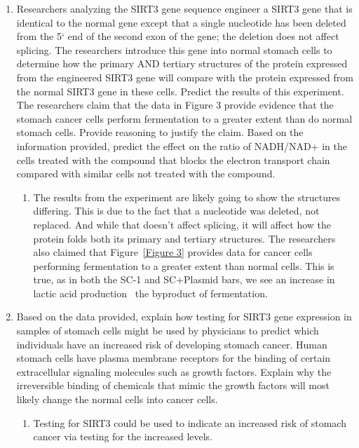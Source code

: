\documentclass[11pt]{article}
\begin{document}
\begin{enumerate}
\begin{enumerate}
        \end{enumerate}
        \item Researchers analyzing the SIRT3 gene sequence engineer a SIRT3 gene that is identical to the
normal gene except that a single nucleotide has been deleted from the 5` end of the second
exon of the gene; the deletion does not affect splicing. The researchers introduce this gene into
normal stomach cells to determine how the primary AND tertiary structures of the protein
expressed from the engineered SIRT3 gene will compare with the protein expressed from the
normal SIRT3 gene in these cells. Predict the results of this experiment. The researchers claim
that the data in Figure 3 provide evidence that the stomach cancer cells perform fermentation
to a greater extent than do normal stomach cells. Provide reasoning to justify the claim. Based
on the information provided, predict the effect on the ratio of NADH/NAD+ in the cells treated
with the compound that blocks the electron transport chain compared with similar cells not
treated with the compound.
        \begin{enumerate}
            \item The results from the experiment are likely going to show the structures differing.
            This is due to the fact that a nucleotide was deleted, not replaced.
            And while that doesn't affect splicing, it will affect how the protein folds both its primary and tertiary structures.
            The researchers also claimed that Figure~\ref{Figure 3} provides data for cancer cells performing fermentation to a greater extent than normal cells.
            This is true, as in both the SC-1 and SC+Plasmid bars, we see an increase in lactic acid production \textemdash\ the byproduct of fermentation.
        \end{enumerate}
        \item Based on the data provided, explain how testing for SIRT3 gene expression in samples of
stomach cells might be used by physicians to predict which individuals have an increased risk of
developing stomach cancer. Human stomach cells have plasma membrane receptors for the
binding of certain extracellular signaling molecules such as growth factors. Explain why the
irreversible binding of chemicals that mimic the growth factors will most likely change the
normal cells into cancer cells.
        \begin{enumerate}
            \item Testing for SIRT3 could be used to indicate an increased risk of stomach cancer via testing for the increased levels.

\end{enumerate}
\end{enumerate}
\end{document}
